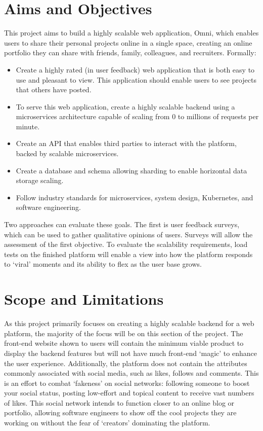 \section{Aims and Objectives}
\label{sec:intro-aims}
This project aims to build a highly scalable web application, Omni, which enables users to share their personal projects online in a single space, creating an online portfolio they can share with friends, family, colleagues, and recruiters.
Formally:
\begin{itemize}
    \item Create a highly rated (in user feedback) web application that is both easy to use and pleasant to view. This application should enable users to see projects that others have posted.
    \item To serve this web application, create a highly scalable backend using a microservices architecture capable of scaling from 0 to millions of requests per minute.
    \item Create an API that enables third parties to interact with the platform, backed by scalable microservices.
    \item Create a database and schema allowing sharding to enable horizontal data storage scaling.
    \item Follow industry standards for microservices, system design, Kubernetes, and software engineering.
\end{itemize}
Two approaches can evaluate these goals. The first is user feedback surveys, which can be used to gather qualitative opinions of users.
Surveys will allow the assessment of the first objective. To evaluate the scalability requirements, load tests on the finished platform will enable a view into how the platform responds to `viral' moments and its ability to flex as the user base grows.

\section{Scope and Limitations}
\label{sec:intro-scope}
As this project primarily focuses on creating a highly scalable backend for a web platform, the majority of the focus will be on this section of the project. 
The front-end website shown to users will contain the minimum viable product to display the backend features but will not have much front-end `magic' to enhance the user experience.
Additionally, the platform does not contain the attributes commonly associated with social media, such as likes, follows and comments.
This is an effort to combat `fakeness' on social networks: following someone to boost your social status, posting low-effort and topical content to receive vast numbers of likes.
This social network intends to function closer to an online blog or portfolio, allowing software engineers to show off the cool projects they are working on without the fear of `creators' dominating the platform. 

